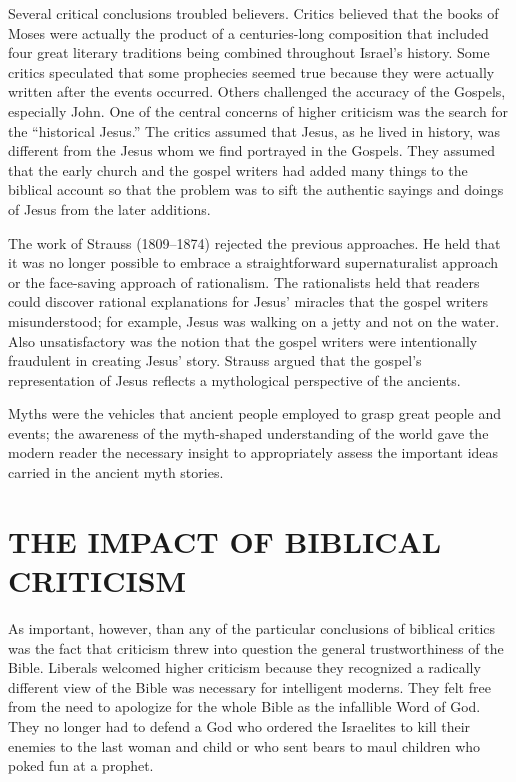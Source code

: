 Several critical conclusions troubled believers. Critics believed that the books of Moses were
actually the product of a centuries-long composition that included four great literary traditions
being combined throughout Israel’s history. Some critics speculated that some prophecies seemed true
because they were actually written after the events occurred. Others challenged the accuracy of the
Gospels, especially John. One of the central concerns of higher criticism was the search for the
“historical Jesus.” The critics assumed that Jesus, as he lived in history, was different from the
Jesus whom we find portrayed in the Gospels. They assumed that the early church and the gospel
writers had added many things to the biblical account so that the problem was to sift the authentic
sayings and doings of Jesus from the later additions.

The work of Strauss (1809–1874) rejected the previous approaches. He held that it was no longer
possible to embrace a straightforward supernaturalist approach or the face-saving approach of
rationalism. The rationalists held that readers could discover rational explanations for Jesus’
miracles that the gospel writers misunderstood; for example, Jesus was walking on a jetty and not on
the water. Also unsatisfactory was the notion that the gospel writers were intentionally fraudulent
in creating Jesus’ story. Strauss argued that the gospel’s representation of Jesus reflects a
mythological perspective of the ancients.

Myths were the vehicles that ancient people employed to grasp great people and events; the awareness
of the myth-shaped understanding of the world gave the modern reader the necessary insight to
appropriately assess the important ideas carried in the ancient myth stories.

\section{THE IMPACT OF BIBLICAL CRITICISM}

As important, however, than any of the particular conclusions of biblical critics was the fact that
criticism threw into question the general trustworthiness of the Bible. Liberals welcomed higher
criticism because they recognized a radically different view of the Bible was necessary for
intelligent moderns. They felt free from the need to apologize for the whole Bible as the infallible
Word of God. They no longer had to defend a God who ordered the Israelites to kill their enemies to
the last woman and child or who sent bears to maul children who poked fun at a prophet.

